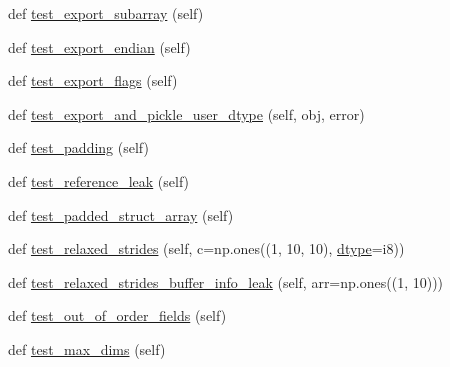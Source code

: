 \begin{DoxyCompactItemize}
\item 
def \hyperlink{classnumpy_1_1core_1_1tests_1_1test__multiarray_1_1TestNewBufferProtocol_af9b70ef3eb1c1c5d49551e34396ab15a}{test\+\_\+export\+\_\+subarray} (self)
\item 
def \hyperlink{classnumpy_1_1core_1_1tests_1_1test__multiarray_1_1TestNewBufferProtocol_a04149d0a289b77407ec81c9c329447fd}{test\+\_\+export\+\_\+endian} (self)
\item 
def \hyperlink{classnumpy_1_1core_1_1tests_1_1test__multiarray_1_1TestNewBufferProtocol_aae5ec203ff34d29638e4c3309b4f35dc}{test\+\_\+export\+\_\+flags} (self)
\item 
def \hyperlink{classnumpy_1_1core_1_1tests_1_1test__multiarray_1_1TestNewBufferProtocol_ae1c0b1716bed1b08b83c58923bf1e01d}{test\+\_\+export\+\_\+and\+\_\+pickle\+\_\+user\+\_\+dtype} (self, obj, error)
\item 
def \hyperlink{classnumpy_1_1core_1_1tests_1_1test__multiarray_1_1TestNewBufferProtocol_a257fdbc663c1ced43bfd9c702f02b35c}{test\+\_\+padding} (self)
\item 
def \hyperlink{classnumpy_1_1core_1_1tests_1_1test__multiarray_1_1TestNewBufferProtocol_a71dd30988151c757fad8bffbbd539638}{test\+\_\+reference\+\_\+leak} (self)
\item 
def \hyperlink{classnumpy_1_1core_1_1tests_1_1test__multiarray_1_1TestNewBufferProtocol_a95380263283652049e95c9b5887864c9}{test\+\_\+padded\+\_\+struct\+\_\+array} (self)
\item 
def \hyperlink{classnumpy_1_1core_1_1tests_1_1test__multiarray_1_1TestNewBufferProtocol_a76cdd6668190d0c7840f6496189a7705}{test\+\_\+relaxed\+\_\+strides} (self, c=np.\+ones((1, 10, 10), \hyperlink{classnumpy_1_1core_1_1tests_1_1test__multiarray_1_1TestNewBufferProtocol_a3250718656f06991ca9307ea8f73b9eb}{dtype}=\textquotesingle{}i8\textquotesingle{}))
\item 
def \hyperlink{classnumpy_1_1core_1_1tests_1_1test__multiarray_1_1TestNewBufferProtocol_aa2a1045db68042ba70905ec73ebbb286}{test\+\_\+relaxed\+\_\+strides\+\_\+buffer\+\_\+info\+\_\+leak} (self, arr=np.\+ones((1, 10)))
\item 
def \hyperlink{classnumpy_1_1core_1_1tests_1_1test__multiarray_1_1TestNewBufferProtocol_aeffaf9f64efcfaac5a59136962acecc0}{test\+\_\+out\+\_\+of\+\_\+order\+\_\+fields} (self)
\item 
def \hyperlink{classnumpy_1_1core_1_1tests_1_1test__multiarray_1_1TestNewBufferProtocol_a76ea4fc0a5dc716e468415172e5f5de1}{test\+\_\+max\+\_\+dims} (self)
\item 

\end{DoxyCompactItemize}
